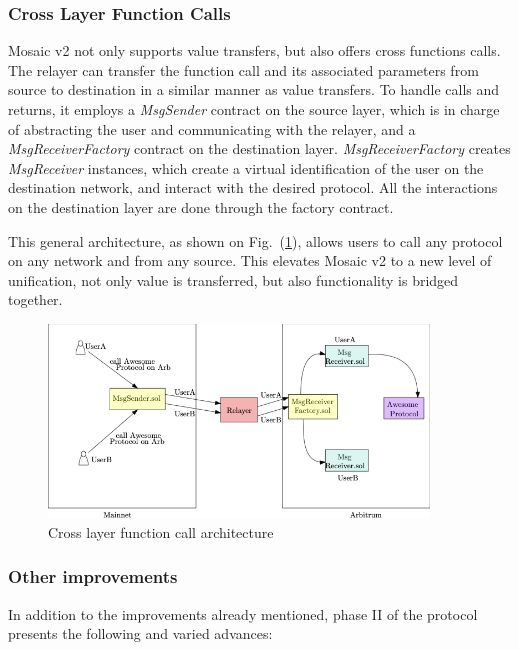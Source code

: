 \subsubsection*{Cross Layer Function Calls}
Mosaic v2 not only supports value transfers, but also offers cross functions calls. The relayer can transfer the function call and its associated parameters from source to destination in a similar manner as value transfers. To handle calls and returns, it employs a \textit{MsgSender} contract on the source layer, which is in charge of abstracting the user and communicating with the relayer, and a \textit{MsgReceiverFactory} contract on the destination layer. \textit{MsgReceiverFactory} creates \textit{MsgReceiver} instances, which create a virtual identification of the user on the destination network, and interact with the desired protocol. All the interactions on the destination layer are done through the factory contract.

This general architecture, as shown on Fig.~(\ref{fig:crosscall}), allows users to call any protocol on any network and from any source. This elevates Mosaic v2 to a new level of unification, not only value is transferred, but also functionality is bridged together. 

\begin{figure}[H]
    \centering
    \includegraphics[width=0.9\textwidth]{images/mosaic/crosscalls.png}
    \caption{Cross layer function call architecture}
    \label{fig:crosscall}
\end{figure}


\subsubsection*{Other improvements}
In addition to the improvements already mentioned, phase II of the protocol presents the following and varied advances:


